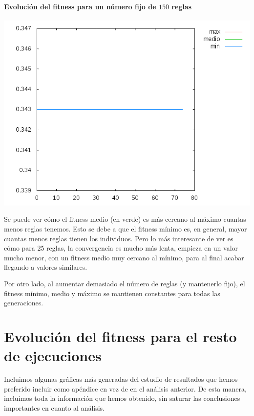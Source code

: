 \documentclass[nochap]{apuntes}
\begin{document}
\paragraph{Evolución del fitness para un número fijo de $150$ reglas}
\begin{center}
\includegraphics[scale=0.5]{tex/img/g75_p75_MejoresPorPeores_SeleccionProporcionalAlFitness_reg150.png}
\end{center}

Se puede ver cómo el fitness medio (en verde) es más cercano al máximo cuantas menos reglas tenemos. Esto se debe a que el fitness mínimo es, en general, mayor cuantas menos reglas tienen los individuos. Pero lo más interesante de ver es cómo para 25 reglas, la convergencia es mucho más lenta, empieza en un valor mucho menor, con un fitness medio muy cercano al mínimo, para al final acabar llegando a valores similares.

Por otro lado, al aumentar demasiado el número de reglas (y mantenerlo fijo), el fitness mínimo, medio y máximo se mantienen constantes para todas las generaciones.


\section{Evolución del fitness para el resto de ejecuciones}

Incluimos algunas gráficas más generadas del estudio de resultados que hemos preferido incluir como apéndice en vez de en el análisis anterior. De esta manera, incluimos toda la información que hemos obtenido, sin saturar las conclusiones importantes en cuanto al análisis.
\end{document}
